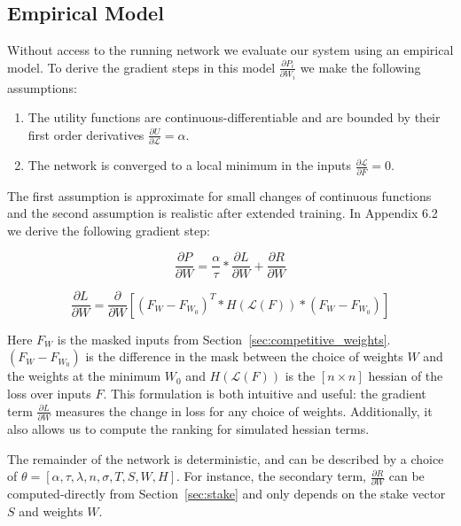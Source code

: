 \documentclass{article}
\begin{document}
\subsection{Empirical Model}

Without access to the running network we evaluate our system using an empirical model. To derive the gradient steps in this model $\frac{\partial P_i}{\partial W_i}$ we make the following assumptions: 

\begin{enumerate}
	\item The utility functions are continuous-differentiable and are bounded by their first order derivatives $\frac{\partial U}{\partial \mathcal{L}} = \alpha$.
	\item  The network is converged to a local minimum in the inputs $\frac{\partial\mathcal{L}}{\partial F} = 0$.
\end{enumerate}  

The first assumption is approximate for small changes of continuous functions and the second assumption is realistic after extended training. In Appendix 6.2 we derive the following gradient step:
\smallskip

\begin{equation}
\frac{\partial P}{\partial W} = \frac{\alpha}{\tau} * \frac{\partial L}{\partial W} + \frac{\partial R}{\partial W}
\end{equation}
\smallskip


\begin{equation}
\frac{\partial L}{\partial W} = \frac{\partial}{\partial W} [(F_W - F_{W_0})^T * H( \mathcal{L}(F)) * (F_W - F_{W_0})] 
\end{equation}
\smallskip

Here $F_W$ is the masked inputs from Section~\ref{sec:competitive_weights}. $(F_W - F_{W_0})$ is the difference in the mask between the choice of weights $W$ and the weights at the minimum $W_0$ and $H( \mathcal{L}(F))$ is the $[n \times n]$ hessian of the loss over inputs $F$. This formulation is both intuitive and useful: the gradient term $\frac{\partial L}{\partial W}$ measures the change in loss for any choice of weights. Additionally, it also allows us to compute the ranking for simulated hessian terms.
\smallskip

The remainder of the network is deterministic, and can be described by a choice of $\theta = [\alpha, \tau, \lambda, n, \sigma, T, S, W, H]$. For instance, the secondary term, $\frac{\partial R}{\partial W}$ can be computed-directly from Section~\ref{sec:stake} and only depends on the stake vector $S$ and weights $W$.
\smallskip
\end{document}
